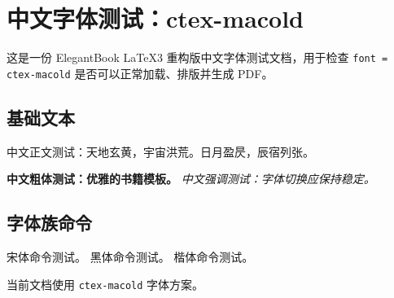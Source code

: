 \documentclass[lang = cn, font = ctex-macold, mode = simple]{elegantbook-l3}
\begin{document}
\frontmatter
\tableofcontents

\mainmatter
\chapter{中文字体测试：ctex-macold}

这是一份 ElegantBook LaTeX3 重构版中文字体测试文档，用于检查
\texttt{font = ctex-macold} 是否可以正常加载、排版并生成 PDF。

\section{基础文本}

中文正文测试：天地玄黄，宇宙洪荒。日月盈昃，辰宿列张。

\textbf{中文粗体测试：优雅的书籍模板。}
\emph{中文强调测试：字体切换应保持稳定。}

\section{字体族命令}

{\songti 宋体命令测试。}
{\heiti 黑体命令测试。}
{\kaishu 楷体命令测试。}

\begin{theorem}[字体方案]
  当前文档使用 \texttt{ctex-macold} 字体方案。
\end{theorem}
\end{document}
